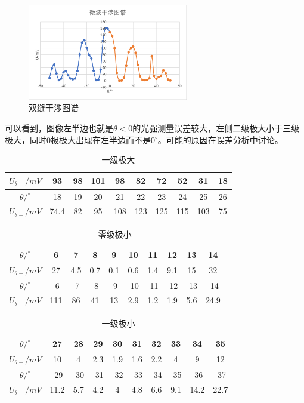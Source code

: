 \documentclass[11pt]{article}
\begin{document}
        \begin{figure}[H]
            \centering
            \includegraphics[width=7cm]{Fig/5.png}
            \caption{双缝干涉图谱}
        \end{figure}
    可以看到，图像左半边也就是$\theta<0$的光强测量误差较大，左侧二级极大小于三级极大，同时0极极大出现在左半边而不是$0^\circ$。可能的原因在误差分析中讨论。
    \begin{table}[H]
        \centering
        \caption{一级极大}
        \begin{tabular}{|c|c|c|c|c|c|c|c|c|c|}
        \hline
            $U_{\theta +}/mV$ & 93 & 98 & 101 & 98 & 82 & 72 & 52 & 31 & 18 \\ \hline
            $\theta /^\circ$ & 18 & 19 & 20 & 21 & 22 & 23 & 24 & 25 & 26 \\ \hline
            $U_{\theta -}/mV$ & 74.4 & 82 & 95 & 108 & 123 & 125 & 115 & 103 & 75 \\ \hline
        \end{tabular}
    \end{table}
    \begin{table}[H]
        \centering
        \caption{零级极小}
        \begin{tabular}{|c|c|c|c|c|c|c|c|c|c|}
        \hline
            $\theta /^\circ$ & 6 & 7 & 8 & 9 & 10 & 11 & 12 & 13 & 14 \\ \hline
            $U_{\theta +}/mV$ & 27 & 4.5 & 0.7 & 0.1 & 0.6 & 1.4 & 9.1 & 15 & 32 \\ \hline
            $\theta /^\circ$ & -6 & -7 & -8 & -9 & -10 & -11 & -12 & -13 & -14 \\ \hline
            $U_{\theta -}/mV$ & 111 & 86 & 41 & 13 & 2.9 & 1.2 & 1.9 & 5.6 & 24.9 \\ \hline
        \end{tabular}
    \end{table}
    \begin{table}[!ht]
        \centering
        \caption{一级极小}
        \begin{tabular}{|c|c|c|c|c|c|c|c|c|c|}
        \hline
            $\theta /^\circ$ & 27 & 28 & 29 & 30 & 31 & 32 & 33 & 34 & 35 \\ \hline
            $U_{\theta +}/mV$ & 10 & 4 & 2.3 & 1.9 & 1.6 & 2.2 & 4 & 9 & 12 \\ \hline
            $\theta /^\circ$ & -29 & -30 & -31 & -32 & -33 & -34 & -35 & -36 & -37 \\ \hline
            $U_{\theta -}/mV$ & 11.2 & 5.7 & 4.2 & 4 & 4.8 & 6.6 & 9.1 & 14.2 & 22.7 \\ \hline
        \end{tabular}
    \end{table}
\end{document}
